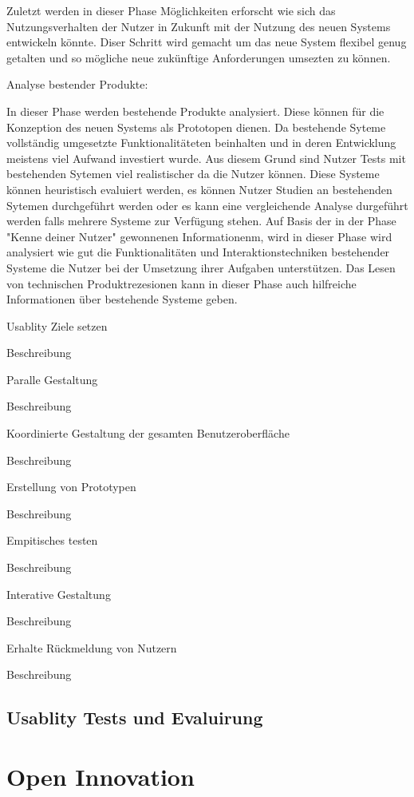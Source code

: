 Zuletzt werden in dieser Phase Möglichkeiten erforscht wie sich das Nutzungsverhalten der Nutzer in Zukunft mit der Nutzung des neuen Systems entwickeln könnte. Diser Schritt wird  
gemacht um das neue System flexibel genug getalten und so mögliche neue zukünftige Anforderungen umsezten zu können.

Analyse bestender Produkte: 

In dieser Phase werden bestehende Produkte analysiert. Diese können für die Konzeption des neuen Systems als Prototopen dienen. Da bestehende Syteme vollständig 
umgesetzte Funktionalitäteten beinhalten und in deren Entwicklung meistens viel Aufwand investiert wurde. Aus diesem Grund sind Nutzer Tests mit bestehenden Sytemen 
viel realistischer da die Nutzer können. 
Diese Systeme können heuristisch evaluiert werden, es können Nutzer Studien an bestehenden Sytemen durchgeführt werden
oder es kann eine vergleichende Analyse durgeführt werden falls mehrere Systeme zur Verfügung stehen. 
Auf Basis der in der Phase "Kenne deiner Nutzer" gewonnenen Informationenm, wird in dieser Phase wird analysiert wie gut die  Funktionalitäten und Interaktionstechniken bestehender 
Systeme die Nutzer bei der Umsetzung ihrer Aufgaben unterstützen. Das Lesen von technischen Produktrezesionen kann in dieser Phase auch hilfreiche Informationen über bestehende 
Systeme geben. 

Usablity Ziele setzen 

Beschreibung

Paralle Gestaltung   

Beschreibung

Koordinierte Gestaltung der gesamten Benutzeroberfläche  

Beschreibung 

Erstellung von Prototypen  

Beschreibung 

Empitisches testen 

 Beschreibung 

Interative Gestaltung  

Beschreibung 

Erhalte Rückmeldung von Nutzern  

Beschreibung 






\subsection{Usablity Tests und Evaluirung}


\section{Open Innovation}





